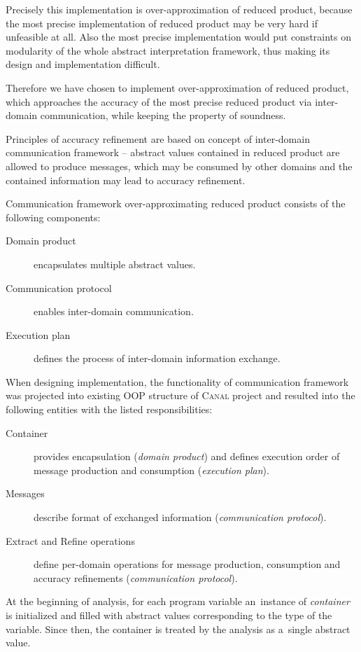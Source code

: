 \documentclass[12pt,oneside]{fithesis2}
\theoremstyle{definition}
\begin{document}
Precisely this implementation is over-approximation of reduced product, because the most precise implementation of reduced product may be very hard if unfeasible at all. Also the most precise implementation would put constraints on modularity of the whole abstract interpretation framework, thus making its design and implementation difficult.

Therefore we have chosen to implement over-approximation of reduced product, which approaches the accuracy of the most precise reduced product via inter-domain communication, while keeping the property of soundness.

Principles of accuracy refinement are based on concept of inter-domain communication framework -- abstract values contained in reduced product are allowed to produce messages, which may be consumed by other domains and the contained information may lead to accuracy refinement.

Communication framework over-approximating reduced product consists of the following components:

\begin{description}
  \item[Domain product] encapsulates multiple abstract values.
  \item[Communication protocol] enables inter-domain communication.
  \item[Execution plan] defines the process of inter-domain information exchange.
\end{description}

When designing implementation, the functionality of communication framework was projected into existing OOP structure of \textsc{Canal} project and resulted into the following entities with the listed responsibilities:

\begin{description}
  \item[Container] provides encapsulation (\textit{domain product}) and defines execution order of message production and consumption (\textit{execution plan}).
  \item[Messages] describe format of exchanged information (\textit{communication protocol}).
  \item[Extract and Refine operations] define per-domain operations for message production, consumption and accuracy refinements (\textit{communication protocol}).
\end{description}

At the beginning of analysis, for each program variable an~instance of \textit{container} is initialized and filled with abstract values corresponding to the type of the variable. Since then, the container is treated by the analysis as a~single abstract value.
\end{document}
